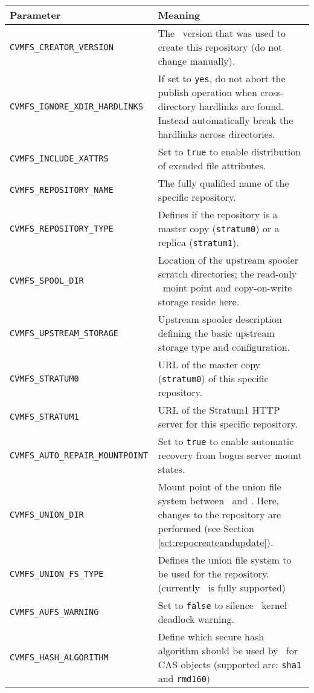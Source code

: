 	\begin{longtable}{lX}
		\toprule
		{\bf\centering Parameter} 			& {\bf\centering Meaning}\\
		\midrule
		\tt CVMFS\_CREATOR\_VERSION			& The \cvmfs\ version that was used to create this repository (do not change manually).\\
		\tt CVMFS\_IGNORE\_XDIR\_HARDLINKS		& If set to \texttt{yes}, do not abort the publish operation when cross-directory hardlinks are found.  Instead automatically break the hardlinks across directories.\\
		\tt CVMFS\_INCLUDE\_XATTRS	& Set to \texttt{true} to enable distribution of exended file attributes.\\
		\tt CVMFS\_REPOSITORY\_NAME			& The fully qualified name of the specific repository.\\
		\tt CVMFS\_REPOSITORY\_TYPE			& Defines if the repository is a master copy (\texttt{stratum0}) or a replica (\texttt{stratum1}).\\
		\tt CVMFS\_SPOOL\_DIR					& Location of the upstream spooler scratch directories; the read-only \cvmfs\ moint point and copy-on-write storage reside here.\\
		\tt CVMFS\_UPSTREAM\_STORAGE			& Upstream spooler description defining the basic upstream storage type and configuration.\\
		\tt CVMFS\_STRATUM0					& URL of the master copy (\texttt{stratum0}) of this specific repository.\\
		\tt CVMFS\_STRATUM1					& URL of the Stratum1 HTTP server for this specific repository.\\
		\tt CVMFS\_AUTO\_REPAIR\_MOUNTPOINT	& Set to \texttt{true} to enable automatic recovery from bogus server mount states.\\
		\tt CVMFS\_UNION\_DIR					& Mount point of the union file system between \cvmfs\ and \aufs. Here, changes to the repository are performed (see Section \ref{sct:repocreateandupdate}).\\
		\tt CVMFS\_UNION\_FS\_TYPE	& Defines the union file system to be used for the repository. \newline (currently \aufs\ is fully supported)\\
		\tt CVMFS\_AUFS\_WARNING	& Set to \texttt{false} to silence \aufs\ kernel deadlock warning.\\
		\tt CVMFS\_HASH\_ALGORITHM	& Define which secure hash algorithm should be used by \cvmfs\ for CAS objects \newline (supported are: \texttt{sha1} and \texttt{rmd160})\\

\end{longtable}
